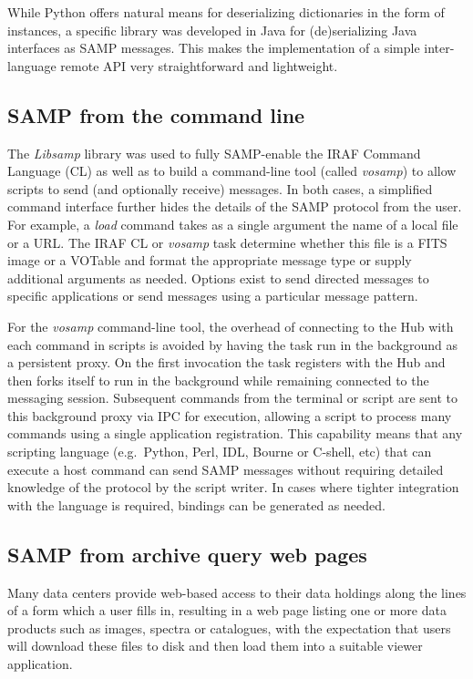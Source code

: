 While Python offers natural means for deserializing dictionaries in the
form of instances, a specific library was developed in Java for
(de)serializing Java interfaces as SAMP messages. This makes the
implementation of a simple inter-language remote API very straightforward
and lightweight.

\subsection{SAMP from the command line}

The {\em Libsamp\/} library was used to fully SAMP-enable
the IRAF Command Language
(CL) as well as to build a command-line tool (called {\em vosamp\/}) to
allow scripts to send (and optionally receive) messages.  In both cases,
a simplified command interface further hides the details of the SAMP
protocol from the user.  For example, a {\em load\/} command takes as a single
argument the name of a local file or a URL. The IRAF CL or {\em vosamp\/}
task determine whether this file is a FITS image or a VOTable and format
the appropriate message type or supply additional arguments as needed.
Options exist to send directed messages to specific applications or send
messages using a particular message pattern.

For the {\em vosamp\/} command-line tool, the overhead of connecting to the
Hub with each command in scripts is avoided by having the task run in
the background as a persistent proxy.  On the first invocation the task
registers with the Hub and then forks itself to run in the background
while remaining connected to the messaging session.  Subsequent commands
from the terminal or script are sent to this background proxy via IPC
for execution, allowing a script to process many commands using a single
application registration.  This capability means that any scripting language
(e.g.\ Python, Perl, IDL, Bourne or C-shell, etc) that can execute a host
command can send SAMP messages without requiring detailed knowledge of the
protocol by the script writer.  In cases where tighter integration
with the language is required, bindings can be generated as needed.

\subsection{SAMP from archive query web pages}

Many data centers provide web-based access to their data holdings
along the lines of a form which a user fills in, resulting in a
web page listing one or more data products such as images, spectra
or catalogues, with the expectation that users will download these
files to disk and then load them into a suitable viewer application.

